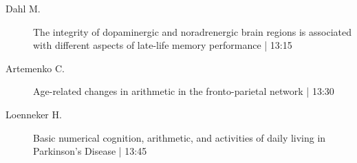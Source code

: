 \begin{symposium}
\begin{description}
                \item [ Dahl M.] The integrity of dopaminergic and noradrenergic brain regions is associated with different aspects of late-life memory performance \textcolor{mygray}{ | 13:15}    
                
                \item [ Artemenko C.] Age-related changes in arithmetic in the fronto-parietal network \textcolor{mygray}{ | 13:30}    
                
                \item [ Loenneker H.] Basic numerical cognition, arithmetic, and activities of daily living in Parkinson’s Disease \textcolor{mygray}{ | 13:45}    
                
            \end{description} 
            \end{symposium}
            